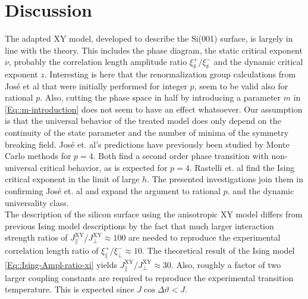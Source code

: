 	\section{Discussion}
	The adapted XY model, developed to describe the Si(001) surface, is largely in line with the theory. This includes the phase diagram, the static critical exponent $\nu$, probably the correlation length amplitude ratio $\xi_\delta^+ /	\xi_\delta^-$ and the dynamic critical exponent $z$. Interesting is here that the renormalization group calculations from José et al \cite{jose1977renormalization} that were initially performed for integer $p$, seem to be valid also for rational $p$. Also, cutting the phase space in half by introducing a parameter $m$ in \eqref{Eq::m-introduction} does not seem to have an effect whatsoever. Our assumption is that the universal behavior of the treated model does only depend on the continuity of the state parameter and the number of minima of the symmetry breaking field. José et. al's predictions have previously been studied by Monte Carlo methods \cite{landau1983non, rastelli2004monte} for $p=4$. Both find a second order phase transition with non-universal critical behavior, as is expected for $p=4$. Rastelli et. al \cite{rastelli2004monte} find the Ising critical exponent in the limit of large $h$. The presented investigations join them in confirming José et. al and expand the argument to rational $p$. and the dynamic universality class. \\
	
	The description of the silicon surface using the anisotropic XY model differs from previous Ising model descriptions by the fact that much larger interaction strength ratios of $J_\parallel^{\text{XY}} / J_\perp^{\text{XY}} \approx 100$ are needed to reproduce the experimental correlation length ratio of $\xi_\parallel^+ /	\xi_\perp^- \approx 10$. The theoretical result of the Ising model \eqref{Eq::Ising-Ampl-ratio-xi} yields $J_\parallel^{\text{XY}} / J_\perp^{\text{XY}} \approx 30$. Also, roughly a factor of two larger coupling constants are required to reproduce the experimental transition temperature. This is expected \cite{aizenman1980comparison} since $J \cos \Delta \vartheta < J$.\\


